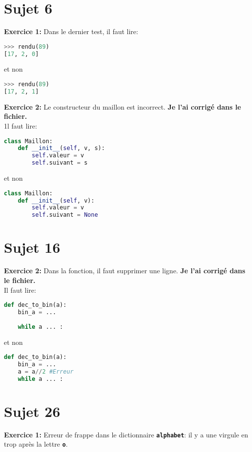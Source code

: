 \documentclass[a4paper,11pt]{article}
\begin{document}
\section{Sujet 6}
\noindent\textbf{Exercice 1:} Dans le dernier test, il faut lire:
\begin{lstlisting}[language=Python  , xleftmargin=2em, xrightmargin=2em]
>>> rendu(89)
[17, 2, 0]
\end{lstlisting}
et non
\begin{lstlisting}[language=Python  , xleftmargin=2em, xrightmargin=2em]
>>> rendu(89)
[17, 2, 1]
\end{lstlisting}
\textbf{Exercice 2:} Le constructeur du maillon est incorrect. \textbf{Je l'ai corrigé dans le fichier.}\\
1l faut lire:
\begin{lstlisting}[language=Python  , xleftmargin=2em, xrightmargin=2em]
class Maillon:
    def __init__(self, v, s):
        self.valeur = v
        self.suivant = s
\end{lstlisting}
et non
\begin{lstlisting}[language=Python  , xleftmargin=2em, xrightmargin=2em]
class Maillon:
    def __init__(self, v):
        self.valeur = v
        self.suivant = None
\end{lstlisting}
\section{Sujet 16}
\noindent\textbf{Exercice 2:} Dans la fonction, il faut supprimer une ligne. \textbf{Je l'ai corrigé dans le fichier.}\\Il faut lire:
\begin{lstlisting}[language=Python  , xleftmargin=2em, xrightmargin=2em]
def dec_to_bin(a):
    bin_a = ...
    
    while a ... :
\end{lstlisting}
et non
\begin{lstlisting}[language=Python  , xleftmargin=2em, xrightmargin=2em]
def dec_to_bin(a):
    bin_a = ...
    a = a//2 #Erreur
    while a ... :
\end{lstlisting}
\section{Sujet 26}
\noindent\textbf{Exercice 1:} Erreur de frappe dans le dictionnaire \textbf{\texttt{alphabet}}: il y a une virgule en trop après la lettre \textbf{\texttt{o}}.
\end{document}
